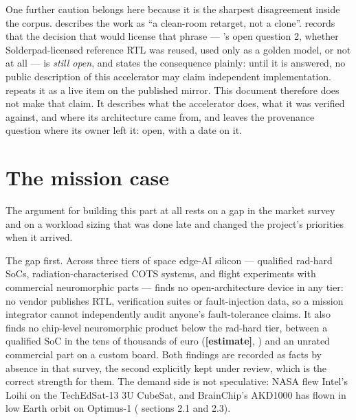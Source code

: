\begin{sloppypar}
One further caution belongs here because it is the sharpest disagreement
inside the corpus.  describes the work as
``a clean-room retarget, not a clone''.  records
that the decision that would license that phrase --- 's open
question 2, whether Solderpad-licensed reference RTL was reused, used
only as a golden model, or not at all --- is \emph{still open}, and
states the consequence plainly: until it is answered, no public
description of this accelerator may claim independent implementation.
 repeats it as a live item on the published mirror.
This document therefore does not make that claim. It describes what the
accelerator does, what it was verified against, and where its
architecture came from, and leaves the provenance question where its
owner left it: open, with a date on it.
\end{sloppypar}

\section{The mission case}
\label{sec:intro-mission}

The argument for building this part at all rests on a gap in the market
survey and on a workload sizing that was done late and changed the
project's priorities when it arrived.

The gap first. Across three tiers of space edge-AI silicon --- qualified
rad-hard SoCs, radiation-characterised COTS systems, and flight
experiments with commercial neuromorphic parts ---  finds no open-architecture device in any tier: no vendor publishes
RTL, verification suites or fault-injection data, so a mission
integrator cannot independently audit anyone's fault-tolerance claims.
It also finds no chip-level neuromorphic product below the rad-hard
tier, between a qualified SoC in the tens of thousands of euro
(\textbf{[estimate]}, ) and an unrated commercial
part on a custom board. Both findings are recorded as facts by absence
in that survey, the second explicitly kept under review, which is the
correct strength for them. The demand side is not speculative: NASA flew Intel's Loihi on the
TechEdSat-13 3U CubeSat, and BrainChip's AKD1000 has flown in low Earth
orbit on Optimus-1 ( sections 2.1 and 2.3).


